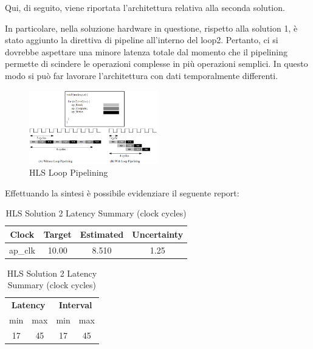Qui, di seguito, viene riportata l'architettura relativa alla seconda solution.



In particolare, nella soluzione hardware in questione, rispetto alla solution 1, è stato aggiunto la direttiva di pipeline all'interno del loop2. Pertanto, ci si dovrebbe aspettare una minore latenza totale dal momento che il pipelining permette di scindere le operazioni complesse in più operazioni semplici. In questo modo si può far lavorare l’architettura con dati temporalmente differenti. 

\begin{figure}[H]
	\centering
	\includegraphics[width=0.5\textwidth]{solutions/s2/looppipelining.png}
	\caption{HLS Loop Pipelining}
\end{figure}

Effettuando la sintesi è possibile evidenziare il seguente report:\\

\begin{table}[H]
	\centering
	\begin{minipage}[t]{0.45\linewidth}
		\centering
		\begin{tabular}{|c|c|c|c|}
			\hline
			\textbf{Clock} & \textbf{Target} & \textbf{Estimated} & \textbf{Uncertainty} \\
			\hline
			ap\_clk & 10.00 & 8.510 & 1.25 \\
			\hline
		\end{tabular}
		\caption{HLS Solution 2 Timing Summary (ns)}
		\label{tab:hls-solution-2-timing-summary}
	\end{minipage}
	\hfill
	\begin{minipage}[t]{0.45\linewidth}
		\centering
		\begin{tabular}{|c|c|c|c|}
			\hline
			\multicolumn{2}{|c|}{\textbf{Latency}} & \multicolumn{2}{|c|}{\textbf{Interval}} \\
			min & max & min & max \\
			\hline
			17 & 45 & 17 & 45 \\
			\hline
		\end{tabular}
		\caption{HLS Solution 2 Latency Summary (clock cycles)}
		\label{tab:hls-solution-2-latency-summary}
	\end{minipage}
\end{table}

